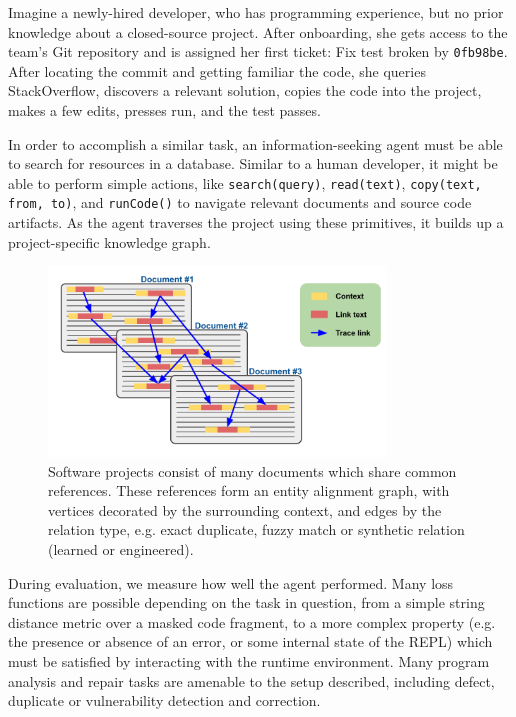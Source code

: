 \documentclass[11pt]{article}
\begin{document}
Imagine a newly-hired developer, who has programming experience, but no prior knowledge about a closed-source project. After onboarding, she gets access to the team's Git repository and is assigned her first ticket: Fix test broken by \texttt{0fb98be}. After locating the commit and getting familiar the code, she queries StackOverflow, discovers a relevant solution, copies the code into the project, makes a few edits, presses run, and the test passes.

In order to accomplish a similar task, an information-seeking agent must be able to search for resources in a database. Similar to a human developer, it might be able to perform simple actions, like \texttt{search(query)}, \texttt{read(text)}, \texttt{copy(text, from, to)}, and \texttt{runCode()} to navigate relevant documents and source code artifacts. As the agent traverses the project using these primitives, it builds up a project-specific knowledge graph.

\begin{figure}
  \centering
  \includegraphics[width=0.8\textwidth]{use_graph}
  \caption{Software projects consist of many documents which share common references. These references form an entity alignment graph, with vertices decorated by the surrounding context, and edges by the relation type, e.g. exact duplicate, fuzzy match or synthetic relation (learned or engineered).}
\end{figure}

During evaluation, we measure how well the agent performed. Many loss functions are possible depending on the task in question, from a simple string distance metric over a masked code fragment, to a more complex property (e.g. the presence or absence of an error, or some internal state of the REPL) which must be satisfied by interacting with the runtime environment. Many program analysis and repair tasks are amenable to the setup described, including defect, duplicate or vulnerability detection and correction.
\end{document}
